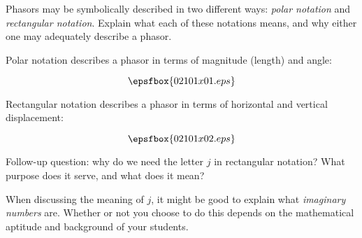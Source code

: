 

Phasors may be symbolically described in two different ways: {\it polar notation} and {\it rectangular notation}.  Explain what each of these notations means, and why either one may adequately describe a phasor.







Polar notation describes a phasor in terms of magnitude (length) and angle:

$$\epsfbox{02101x01.eps}$$

Rectangular notation describes a phasor in terms of horizontal and vertical displacement:

$$\epsfbox{02101x02.eps}$$

Follow-up question: why do we need the letter $j$ in rectangular notation?  What purpose does it serve, and what does it mean?







When discussing the meaning of $j$, it might be good to explain what {\it imaginary numbers} are.  Whether or not you choose to do this depends on the mathematical aptitude and background of your students.




